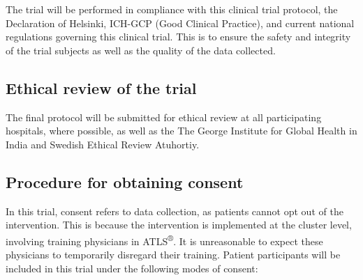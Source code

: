 \documentclass[
]{scrartcl}
\begin{document}
The trial will be performed in compliance with this clinical trial
protocol, the Declaration of Helsinki, ICH-GCP (Good Clinical Practice),
and current national regulations governing this clinical trial. This is
to ensure the safety and integrity of the trial subjects as well as the
quality of the data collected.

\hypertarget{ethical-review-of-the-trial}{%
\subsection{Ethical review of the
trial}\label{ethical-review-of-the-trial}}

The final protocol will be submitted for ethical review at all
participating hospitals, where possible, as well as the The George
Institute for Global Health in India and Swedish Ethical Review
Atuhortiy.

\hypertarget{procedure-for-obtaining-consent}{%
\subsection{Procedure for obtaining
consent}\label{procedure-for-obtaining-consent}}

In this trial, consent refers to data collection, as patients cannot opt
out of the intervention. This is because the intervention is implemented
at the cluster level, involving training physicians in
ATLS\textsuperscript{®}. It is unreasonable to expect these physicians
to temporarily disregard their training. Patient participants will be
included in this trial under the following modes of consent:
\end{document}
